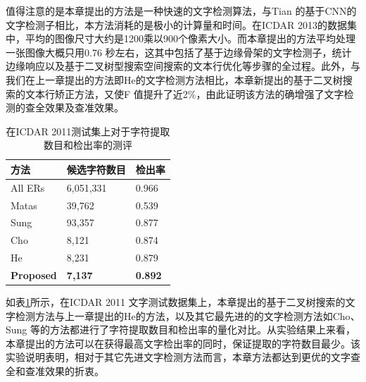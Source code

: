         值得注意的是本章提出的方法是一种快速的文字检测算法，与Tian\cite{Tian2016Text} 的基于CNN的文字检测子相比，本方法消耗的是极小的计算量和时间。在ICDAR 2013的数据集中，平均的图像尺寸大约是1200乘以900个像素大小。而本章提出的方法平均处理一张图像大概只用0.76 秒左右，这其中包括了基于边缘骨架的文字检测子，统计边缘响应以及基于二叉树型搜索空间搜索的文本行优化等步骤的全过程。此外，与我们在上一章提出的方法即He\cite{He2017scene}的文字检测方法相比，本章新提出的基于二叉树搜索的文本行矫正方法，又使F 值提升了近2\%，由此证明该方法的确增强了文字检测的查全效果及查准效果。

        \begin{table}[!h]
        \centering
        \caption{在ICDAR 2011测试集上对于字符提取数目和检出率的测评}
        \begin{tabular}{p{}|p{} p{}}
        \hline
        方法 & 候选字符数目 & 检出率 \\
        \hline
        All ERs & 6,051,331 & 0.966 \\
        Matas\cite{Matas2004Robust} & 39,762 & 0.539 \\
        Sung\cite{Sung2015Scene} & 93,357 & 0.877  \\
        Cho\cite{Cho2016Canny} & 8,121 & 0.874 \\
        He\cite{He2017scene} & 8,231 & 0.879 \\
        \hline
        \textbf{Proposed} & \textbf{7,137} & \textbf{0.892} \\
        \hline
        \end{tabular}
        \label{tab.c4_icdar11}
        \end{table}

        如表\ref{tab.c4_icdar11}所示，在ICDAR 2011 文字测试数据集上，本章提出的基于二叉树搜索的文字检测方法与上一章提出的He\cite{He2017scene}的方法，以及其它最先进的的文字检测方法如Cho\cite{Cho2016Canny}、Sung\cite{Sung2015Scene} 等的方法都进行了字符提取数目和检出率的量化对比。从实验结果上来看，本章提出的方法可以在获得最高文字检出率的同时，保证提取的字符数目最少。该实验说明表明，相对于其它先进文字检测方法而言，本章方法都达到更优的文字查全和查准效果的折衷。

